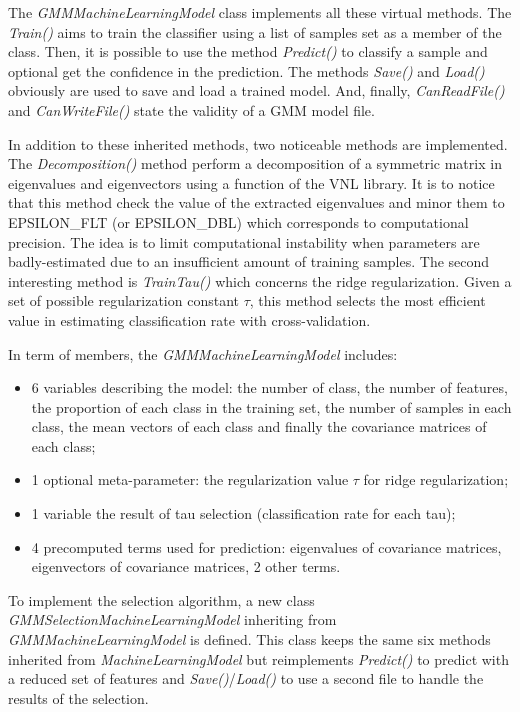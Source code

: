 \documentclass[a4paper,11pt,DIV=16,abstracton]{scrartcl}
\begin{document}
        The \emph{GMMMachineLearningModel} class implements all these virtual methods. The \emph{Train()} aims to train the classifier using a list of samples set as a member of the class. Then, it is possible to use the method \emph{Predict()} to classify a sample and optional get the confidence in the prediction. The methods \emph{Save()} and \emph{Load()} obviously are used to save and load a trained model. And, finally, \emph{CanReadFile()} and \emph{CanWriteFile()} state the validity of a GMM model file.

        In addition to these inherited methods, two noticeable methods are implemented. The \emph{Decomposition()} method perform a decomposition of a symmetric matrix in eigenvalues and eigenvectors using a function of the VNL library. It is to notice that this method check the value of the extracted eigenvalues and minor them to EPSILON\_FLT (or EPSILON\_DBL) which corresponds to computational precision.  The idea is to limit computational instability when parameters are badly-estimated due to an insufficient amount of training samples. The second interesting method is \emph{TrainTau()} which concerns the ridge regularization. Given a set of possible regularization constant $\tau$, this method selects the most efficient value in estimating classification rate with cross-validation.

        In term of members, the \emph{GMMMachineLearningModel} includes:
        \begin{itemize}
            \item 6 variables describing the model: the number of class, the number of features, the proportion of each class in the training set, the number of samples in each class, the mean vectors of each class and finally the covariance matrices of each class;
            \item 1 optional meta-parameter: the regularization value $\tau$ for ridge regularization;
            \item 1 variable the result of tau selection (classification rate for each tau);
            \item 4 precomputed terms used for prediction: eigenvalues of covariance matrices, eigenvectors of covariance matrices, 2 other terms.
        \end{itemize}

        To implement the selection algorithm, a new class \emph{GMMSelectionMachineLearningModel} inheriting from \emph{GMMMachineLearningModel} is defined. This class keeps the same six methods inherited from \emph{MachineLearningModel} but reimplements \emph{Predict()} to predict with a reduced set of features and  \emph{Save()}/\emph{Load()} to use a second file to handle the results of the selection.
\end{document}
